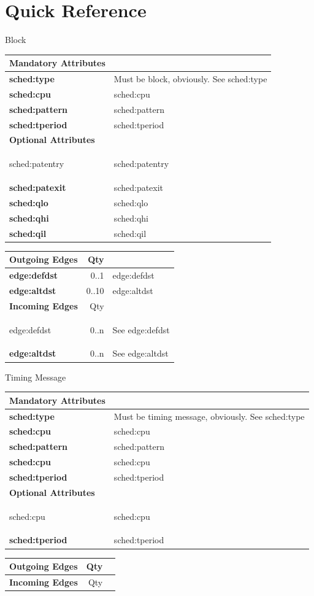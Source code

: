 \chapter{Quick Reference} %
\sloppy
\label{AppendixB} 







\glsaddall

\newcommand{\noedge}{-- &  & \\} 
\newcommand{\edge}[2]{\gls*{#1} & #2 &\glsdesc*{#1}\\} %
\newcommand{\shortedge}[2]{\gls*{#1} & #2 & See \gls{#1}\\} 
\newcommand{\shortattrib}[1]{\gls*{#1} & See \gls{#1}\\}
\newcommand{\attrib}[1]{\gls*{#1} & \glsdesc*{#1}\\}

\newcommand{\attribtable}[5]{
  {\Huge #1}\\
  \renewcommand{\arraystretch}{1.25}
  \begin{tabularx}{\textwidth}{>{\bfseries}lX}
  \toprule
  Mandatory Attributes&\\
  \midrule
  \gls*{sched:type} & Must be \MakeLowercase{#1}, obviously. See \gls{sched:type}\\
  \attrib{sched:cpu}
  \attrib{sched:pattern}
  #2
  Optional Attributes&\\
  \midrule
  #3
  \end{tabularx} 
  \begin{tabularx}{\textwidth}{>{\bfseries}lrX}
  Outgoing Edges&Qty\\
  \midrule
  #4
  Incoming Edges&Qty\\
  \midrule
  #5
  \end{tabularx}  
}
\newpage
\attribtable{Block}{
  \attrib{sched:tperiod}
}{
  \attrib{sched:patentry}
  \attrib{sched:patexit}
  \attrib{sched:qlo}
  \attrib{sched:qhi}
  \attrib{sched:qil}
}{
  \edge{edge:defdst}{0..1}
  \edge{edge:altdst}{0..10}
}{
  \shortedge{edge:defdst}{0..n}
  \shortedge{edge:altdst}{0..n}
}
\vspace*{2em}

\attribtable{Timing Message}{
  \attrib{sched:cpu}
  \attrib{sched:tperiod}
}{
  \attrib{sched:cpu}
  \attrib{sched:tperiod}
}{}{}

